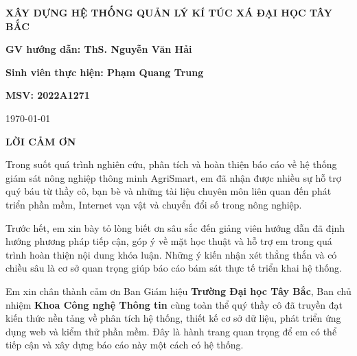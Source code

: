 \documentclass[12pt]{article}
\begin{document}
\begin{titlepage}
		
		\begin{center}
			\fontsize{18pt}{17pt}\selectfont
			\textbf{\textrm{XÂY DỰNG HỆ THỐNG QUẢN LÝ KÍ TÚC XÁ ĐẠI HỌC TÂY BẮC}}
		\end{center}
		
		\vspace{75pt}
		\textbf{GV hướng dẫn: ThS. Nguyễn Văn Hải}
		
		\vspace{10pt}
		
		\textbf{Sinh viên thực hiện: Phạm Quang Trung}
		
		\vspace{10pt}
		\textbf{MSV: 2022A1271}
		
		\vspace{100pt}
		\begin{center}
			\today
		\end{center}
	\end{titlepage}
	
	\newpage
	\thispagestyle{empty}
	\begin{center}
		\fontsize{14pt}{20pt}\selectfont
		\textbf{LỜI CẢM ƠN}
	\end{center}
	
	\vspace{20pt}
	
	Trong suốt quá trình nghiên cứu, phân tích và hoàn thiện báo cáo về hệ thống giám sát nông nghiệp thông minh AgriSmart, em đã nhận được nhiều sự hỗ trợ quý báu từ thầy cô, bạn bè và những tài liệu chuyên môn liên quan đến phát triển phần mềm, Internet vạn vật và chuyển đổi số trong nông nghiệp.
	
	Trước hết, em xin bày tỏ lòng biết ơn sâu sắc đến giảng viên hướng dẫn đã định hướng phương pháp tiếp cận, góp ý về mặt học thuật và hỗ trợ em trong quá trình hoàn thiện nội dung khóa luận. Những ý kiến nhận xét thẳng thắn và có chiều sâu là cơ sở quan trọng giúp báo cáo bám sát thực tế triển khai hệ thống.
	
	Em xin chân thành cảm ơn Ban Giám hiệu \textbf{Trường Đại học Tây Bắc}, Ban chủ nhiệm \textbf{Khoa Công nghệ Thông tin} cùng toàn thể quý thầy cô đã truyền đạt kiến thức nền tảng về phân tích hệ thống, thiết kế cơ sở dữ liệu, phát triển ứng dụng web và kiểm thử phần mềm. Đây là hành trang quan trọng để em có thể tiếp cận và xây dựng báo cáo này một cách có hệ thống.
	
\end{document}
